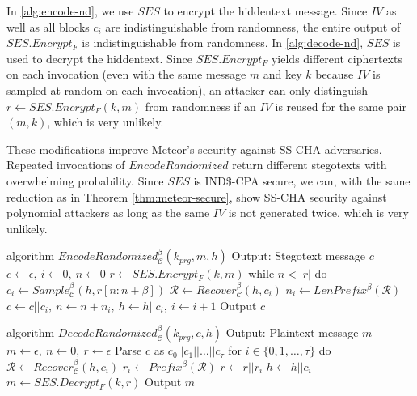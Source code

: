 In \autoref{alg:encode-nd}, we use $SES$ to encrypt the hiddentext message.
Since $IV$ as well as all blocks $c_i$ are indistinguishable from randomness, the entire output of $SES.Encrypt_F$ is indistinguishable from randomness.
In \autoref{alg:decode-nd}, $SES$ is used to decrypt the hiddentext.
Since $SES.Encrypt_F$ yields different ciphertexts on each invocation (even with the same message $m$ and key $k$ because $IV$ is sampled at random on each invocation), an attacker can only distinguish $r \leftarrow SES.Encrypt_F(k,m)$ from randomness if an $IV$ is reused for the same pair $(m,k)$, which is very unlikely.

These modifications improve Meteor's security against SS-CHA adversaries.
Repeated invocations of $EncodeRandomized$ return different stegotexts with overwhelming probability.
Since $SES$ is IND\$-CPA secure, we can, with the same reduction as in Theorem \ref{thm:meteor-secure}, show SS-CHA security against polynomial attackers as long as the same $IV$ is not generated twice, which is very unlikely.

\begin{Pseudocode}[float, caption={
$EncodeRandomized$ algorithm.
This algorithm differs from the original $Encode$ algorithm by using $SES$ to encrypt the message.
The ciphertext (which is indistinguishable from randomness and nondeterministic) is then used to sample from $\mathcal{C}_h$.
}, label={alg:encode-nd}]
algorithm $EncodeRandomized_{\mathcal{C}}^{\beta}(k_{prg}, m, h)$
  Output: Stegotext message $c$
  $c \leftarrow \epsilon,~ i \leftarrow 0,~ n \leftarrow 0$
  $r \leftarrow SES.Encrypt_F(k, m)$
  while $n < |r|$ do
    $c_i \leftarrow Sample_{\mathcal{C}}^\beta(h, r[n: n+\beta])$
    $\mathcal{R} \leftarrow Recover_{\mathcal{C}}^\beta(h, c_i)$
    $n_i \leftarrow LenPrefix^\beta(\mathcal{R})$
    $c \leftarrow c || c_i,~ n \leftarrow n+n_i,~ h \leftarrow h||c_i,~ i \leftarrow i + 1$
  Output $c$
\end{Pseudocode}
\begin{Pseudocode}[float, caption={
$DecodeRandomized$ algorithm.
This algorithm differs from the original $Decode$ algorithm by using $SES$ to decrypt the stegotext.
}, label={alg:decode-nd}]
algorithm $DecodeRandomized_{\mathcal{C}}^{\beta}(k_{prg}, c, h)$
  Output: Plaintext message $m$
  $m \leftarrow \epsilon,~ n \leftarrow 0,~ r \leftarrow \epsilon$
  Parse $c$ as $c_0 || c_1 || \dots || c_{\tau}$
  for $i \in \{ 0, 1, \dots, \tau \}$ do
    $\mathcal{R} \leftarrow Recover_{\mathcal{C}}^\beta(h, c_i)$
    $r_i \leftarrow Prefix^\beta(\mathcal{R})$
    $r \leftarrow r || r_i$
    $h \leftarrow h||c_i$
  $m \leftarrow SES.Decrypt_F(k, r)$
  Output $m$
\end{Pseudocode}